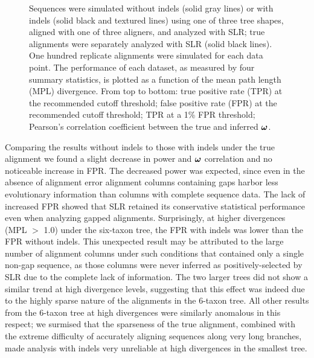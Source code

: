 \documentclass{article}
\begin{document}
\begin{figure}[t]
\begin{center}
\end{center}
\caption{Sequences were simulated without indels (solid gray lines) or with
  indels (solid black and textured lines) using one of three tree shapes, aligned with
  one of three aligners, and analyzed with SLR; true alignments were
  separately analyzed with SLR (solid black lines). One hundred
  replicate alignments were simulated for each data point. The
  performance of each dataset, as measured by four summary statistics,
  is plotted as a function of the mean path length (MPL)
  divergence. From top to bottom: true positive rate (TPR) at the
  recommended cutoff threshold; false positive rate (FPR) at the
  recommended cutoff threshold; TPR at a 1\% FPR threshold; Pearson's
  correlation coefficient between the true and inferred $\bm{\omega}$.}
\label{fig_3}
\end{figure}

Comparing the results without indels to those with indels under the
true alignment we found a slight decrease in power and $\bm{\omega}$
correlation and no noticeable increase in FPR. The decreased power was
expected, since even in the absence of alignment error alignment
columns containing gaps harbor less evolutionary information than
columns with complete sequence data. The lack of increased FPR showed
that SLR retained its conservative statistical performance even when
analyzing gapped alignments. Surprisingly, at higher divergences (MPL
$>$ 1.0) under the six-taxon tree, the FPR with indels was lower than
the FPR without indels. This unexpected result may be attributed to
the large number of alignment columns under such conditions that
contained only a single non-gap sequence, as those columns were never
inferred as positively-selected by SLR due to the complete lack of
information. The two larger trees did not show a similar trend at high
divergence levels, suggesting that this effect was indeed due to the
highly sparse nature of the alignments in the 6-taxon tree. All other
results from the 6-taxon tree at high divergences were similarly
anomalous in this respect; we surmised that the sparseness of the true
alignment, combined with the extreme difficulty of accurately aligning
sequences along very long branches, made \sw analysis with indels very
unreliable at high divergences in the smallest tree.
\end{document}
